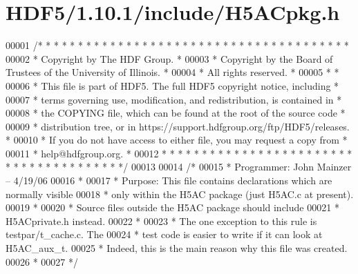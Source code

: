 \hypertarget{_h_d_f5_21_810_81_2include_2_h5_a_cpkg_8h_source}{}\section{H\+D\+F5/1.10.1/include/\+H5\+A\+Cpkg.h}
\label{_h_d_f5_21_810_81_2include_2_h5_a_cpkg_8h_source}

\begin{DoxyCode}
00001 \textcolor{comment}{/* * * * * * * * * * * * * * * * * * * * * * * * * * * * * * * * * * * * * * *}
00002 \textcolor{comment}{ * Copyright by The HDF Group.                                               *}
00003 \textcolor{comment}{ * Copyright by the Board of Trustees of the University of Illinois.         *}
00004 \textcolor{comment}{ * All rights reserved.                                                      *}
00005 \textcolor{comment}{ *                                                                           *}
00006 \textcolor{comment}{ * This file is part of HDF5.  The full HDF5 copyright notice, including     *}
00007 \textcolor{comment}{ * terms governing use, modification, and redistribution, is contained in    *}
00008 \textcolor{comment}{ * the COPYING file, which can be found at the root of the source code       *}
00009 \textcolor{comment}{ * distribution tree, or in https://support.hdfgroup.org/ftp/HDF5/releases.  *}
00010 \textcolor{comment}{ * If you do not have access to either file, you may request a copy from     *}
00011 \textcolor{comment}{ * help@hdfgroup.org.                                                        *}
00012 \textcolor{comment}{ * * * * * * * * * * * * * * * * * * * * * * * * * * * * * * * * * * * * * * */}
00013 
00014 \textcolor{comment}{/*}
00015 \textcolor{comment}{ * Programmer: John Mainzer -- 4/19/06}
00016 \textcolor{comment}{ *}
00017 \textcolor{comment}{ * Purpose:     This file contains declarations which are normally visible}
00018 \textcolor{comment}{ *              only within the H5AC package (just H5AC.c at present).}
00019 \textcolor{comment}{ *}
00020 \textcolor{comment}{ *      Source files outside the H5AC package should include}
00021 \textcolor{comment}{ *      H5ACprivate.h instead.}
00022 \textcolor{comment}{ *}
00023 \textcolor{comment}{ *      The one exception to this rule is testpar/t\_cache.c.  The}
00024 \textcolor{comment}{ *      test code is easier to write if it can look at H5AC\_aux\_t.}
00025 \textcolor{comment}{ *      Indeed, this is the main reason why this file was created.}
00026 \textcolor{comment}{ *}
00027 \textcolor{comment}{ */}

\end{DoxyCode}
